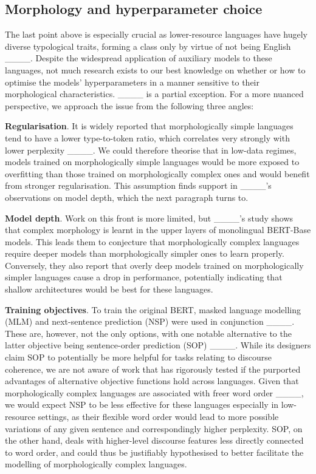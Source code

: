 \subsection{Morphology and hyperparameter choice}
\label{sec:morphology_hyperparameters}
The last point above is especially crucial as lower-resource languages have hugely diverse typological traits, forming a class only by virtue of not being English ____. Despite the widespread application of auxiliary models to these languages, not much research exists to our best knowledge on whether or how to optimise the models' hyperparameters in a manner sensitive to their morphological characteristics. ____ is a partial exception. For a more nuanced perspective, we approach the issue from the following three angles:

\textbf{Regularisation}. It is widely reported that morphologically simple languages tend to have a lower type-to-token ratio, which correlates very strongly with lower perplexity ____. We could therefore theorise that in low-data regimes, models trained on morphologically simple languages would be more exposed to overfitting than those trained on morphologically complex ones and would benefit from stronger regularisation. This assumption finds support in ____'s observations on model depth, which the next paragraph turns to.

\textbf{Model depth}. Work on this front is more limited, but ____'s study shows that complex morphology is learnt in the upper layers of monolingual BERT-Base models. This leads them to conjecture that morphologically complex languages require deeper models than morphologically simpler ones to learn properly. Conversely, they also report that overly deep models trained on morphologically simpler languages cause a drop in performance, potentially indicating that shallow architectures would be best for these languages. 

\textbf{Training objectives}. To train the original BERT, masked language modelling (MLM) and next-sentence prediction (NSP) were used in conjunction ____. These are, however, not the only options, with one notable alternative to the latter objective being sentence-order prediction (SOP) ____. While its designers claim SOP to potentially be more helpful for tasks relating to discourse coherence, we are not aware of work that has rigorously tested if the purported advantages of alternative objective functions hold across languages. Given that morphologically complex languages are associated with freer word order ____, we would expect NSP to be less effective for these languages especially in low-resource settings, as their flexible word order would lead to more possible variations of any given sentence and correspondingly higher perplexity. SOP, on the other hand, deals with higher-level discourse features less directly connected to word order, and could thus be justifiably hypothesised to better facilitate the modelling of morphologically complex languages.